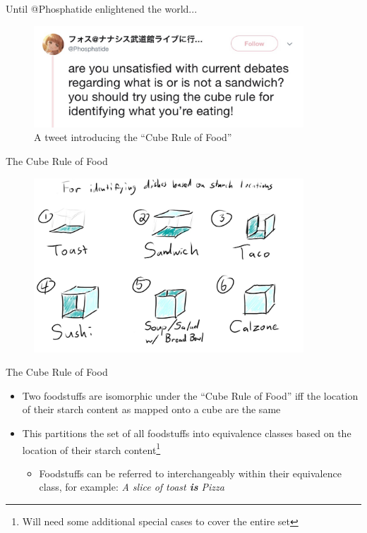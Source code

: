 \documentclass{beamer}
\begin{document}
\begin{frame}{Until @Phosphatide enlightened the world...}
    \begin{figure}
        \includegraphics[width=0.9\textwidth]{phosphatide.jpg}
        \caption{\label{fig:phosphatide}A tweet introducing the ``Cube Rule of Food''\cite{noauthor_phosphatide_nodate}}
    \end{figure}
\end{frame}

\begin{frame}{The Cube Rule of Food}
    \begin{figure}
        \includegraphics[width=0.9\textwidth]{cube_rule_of_food.jpg}
        \label{fig:cube-rule-of-food}
    \end{figure}
\end{frame}

\begin{frame}{The Cube Rule of Food}
    \begin{itemize}
        \item Two foodstuffs are isomorphic under the ``Cube Rule of Food'' iff the location of their starch content as mapped onto a cube are the same
        \vskip 0.5cm
        \item This partitions the set of all foodstuffs into equivalence classes based on the location of their starch content\footnote{Will need some additional special cases to cover the entire set}
        \begin{itemize}
            \item Foodstuffs can be referred to interchangeably within their equivalence class, for example: \textit{A slice of toast \textbf{is} Pizza}
        \end{itemize}
    \end{itemize}
\end{frame}
\end{document}
